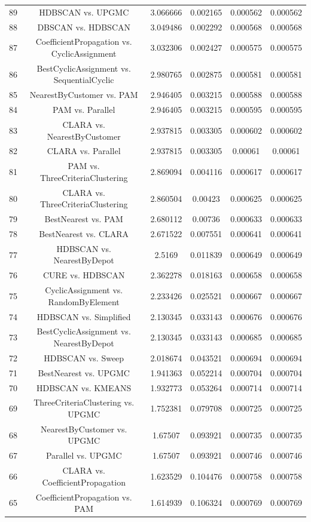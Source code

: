 \documentclass[a4paper,10pt]{article}
\begin{document}
\begin{landscape}
\begin{table}[!htp]
\begin{tabular}{cccccc}
89&HDBSCAN vs. UPGMC&3.066666&0.002165&0.000562&0.000562\\
88&DBSCAN vs. HDBSCAN&3.049486&0.002292&0.000568&0.000568\\
87&CoefficientPropagation vs. CyclicAssignment&3.032306&0.002427&0.000575&0.000575\\
86&BestCyclicAssignment vs. SequentialCyclic&2.980765&0.002875&0.000581&0.000581\\
85&NearestByCustomer vs. PAM&2.946405&0.003215&0.000588&0.000588\\
84&PAM vs. Parallel&2.946405&0.003215&0.000595&0.000595\\
83&CLARA vs. NearestByCustomer&2.937815&0.003305&0.000602&0.000602\\
82&CLARA vs. Parallel&2.937815&0.003305&0.00061&0.00061\\
81&PAM vs. ThreeCriteriaClustering&2.869094&0.004116&0.000617&0.000617\\
80&CLARA vs. ThreeCriteriaClustering&2.860504&0.00423&0.000625&0.000625\\
79&BestNearest vs. PAM&2.680112&0.00736&0.000633&0.000633\\
78&BestNearest vs. CLARA&2.671522&0.007551&0.000641&0.000641\\
77&HDBSCAN vs. NearestByDepot&2.5169&0.011839&0.000649&0.000649\\
76&CURE vs. HDBSCAN&2.362278&0.018163&0.000658&0.000658\\
75&CyclicAssignment vs. RandomByElement&2.233426&0.025521&0.000667&0.000667\\
74&HDBSCAN vs. Simplified&2.130345&0.033143&0.000676&0.000676\\
73&BestCyclicAssignment vs. NearestByDepot&2.130345&0.033143&0.000685&0.000685\\
72&HDBSCAN vs. Sweep&2.018674&0.043521&0.000694&0.000694\\
71&BestNearest vs. UPGMC&1.941363&0.052214&0.000704&0.000704\\
70&HDBSCAN vs. KMEANS&1.932773&0.053264&0.000714&0.000714\\
69&ThreeCriteriaClustering vs. UPGMC&1.752381&0.079708&0.000725&0.000725\\
68&NearestByCustomer vs. UPGMC&1.67507&0.093921&0.000735&0.000735\\
67&Parallel vs. UPGMC&1.67507&0.093921&0.000746&0.000746\\
66&CLARA vs. CoefficientPropagation&1.623529&0.104476&0.000758&0.000758\\
65&CoefficientPropagation vs. PAM&1.614939&0.106324&0.000769&0.000769\\

\end{tabular}
\end{table}
\end{landscape}
\end{document}
